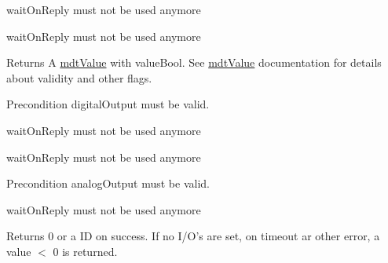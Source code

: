 \begin{DoxyRefList}
\item[\label{deprecated__deprecated000017}%
\hypertarget{deprecated__deprecated000017}{}%
Member \hyperlink{classmdt_multi_io_device_aeb093a59af6b6cac16e32f4ad37652f4}{mdt\-Multi\-Io\-Device\-:\-:get\-Digital\-Outputs} (bool wait\-On\-Reply=true)]wait\-On\-Reply must not be used anymore  
\item[\label{deprecated__deprecated000016}%
\hypertarget{deprecated__deprecated000016}{}%
Member \hyperlink{classmdt_multi_io_device_a9c32969bf05be92b0196fec82f94c49d}{mdt\-Multi\-Io\-Device\-:\-:get\-Digital\-Output\-Value} (\hyperlink{classmdt_digital_io}{mdt\-Digital\-Io} $\ast$digital\-Output, bool query\-Device, bool wait\-On\-Reply=true)]wait\-On\-Reply must not be used anymore \begin{DoxyReturn}{Returns}
A \hyperlink{classmdt_value}{mdt\-Value} with value\-Bool. See \hyperlink{classmdt_value}{mdt\-Value} documentation for details about validity and other flags. 
\end{DoxyReturn}
\begin{DoxyPrecond}{Precondition}
digital\-Output must be valid.  
\end{DoxyPrecond}

\item[\label{deprecated__deprecated000013}%
\hypertarget{deprecated__deprecated000013}{}%
Member \hyperlink{classmdt_multi_io_device_ab01987c9487499d144d9d756979e3b42}{mdt\-Multi\-Io\-Device\-:\-:set\-Analog\-Outputs} (bool wait\-On\-Reply=true)]wait\-On\-Reply must not be used anymore  
\item[\label{deprecated__deprecated000012}%
\hypertarget{deprecated__deprecated000012}{}%
Member \hyperlink{classmdt_multi_io_device_a595ac7361c90bc48d8ef13b8a3a33772}{mdt\-Multi\-Io\-Device\-:\-:set\-Analog\-Output\-Value} (\hyperlink{classmdt_analog_io}{mdt\-Analog\-Io} $\ast$analog\-Output, const \hyperlink{classmdt_value}{mdt\-Value} \&value, bool send\-To\-Device, bool wait\-On\-Reply=true)]wait\-On\-Reply must not be used anymore \begin{DoxyPrecond}{Precondition}
analog\-Output must be valid.  
\end{DoxyPrecond}

\item[\label{deprecated__deprecated000019}%
\hypertarget{deprecated__deprecated000019}{}%
Member \hyperlink{classmdt_multi_io_device_a83f6df71dc35ef002ee55b3a51a54fc9}{mdt\-Multi\-Io\-Device\-:\-:set\-Digital\-Outputs} (bool wait\-On\-Reply=true)]wait\-On\-Reply must not be used anymore \begin{DoxyReturn}{Returns}
0 or a I\-D on success. If no I/\-O's are set, on timeout ar other error, a value $<$ 0 is returned.  
\end{DoxyReturn}


\end{DoxyRefList}
